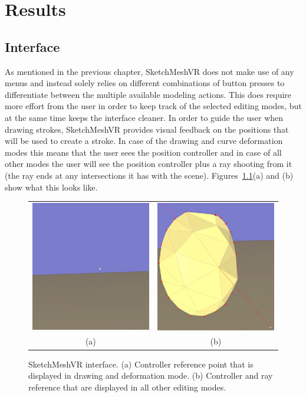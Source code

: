 \chapter{Results}
\label{chap:results}

\section{Interface}
As mentioned in the previous chapter, SketchMeshVR does not make use of any menus and instead solely relies on different combinations of button presses to differentiate between the multiple available modeling actions. This does require more effort from the user in order to keep track of the selected editing modes, but at the same time keeps the interface cleaner. In order to guide the user when drawing strokes, SketchMeshVR provides visual feedback on the positions that will be used to create a stroke. In case of the drawing and curve deformation modes this means that the user sees the position controller and in case of all other modes the user will see the position controller plus a ray shooting from it (the ray ends at any intersections it has with the scene). Figures~\ref{fig:interface}(a) and (b) show what this looks like.

\begin{figure}[!h]
    \centering
    \setlength{\tabcolsep}{0.0130\linewidth}
    \begin{tabular}{@{}cc@{}}
    \includegraphics[width=0.3\linewidth]{figures/interface_point}&
  	\includegraphics[width=0.3\linewidth]{figures/interface_ray}\\
    (a)&(b)\\
    \end{tabular}
    \caption[SketchMeshVR interface]{SketchMeshVR interface.
    	  \textup{(a)} Controller reference point that is displayed in drawing and deformation mode.
			  \textup{(b)} Controller and ray reference that are displayed in all other editing modes. 
      \label{fig:interface}}
\end{figure}
 
